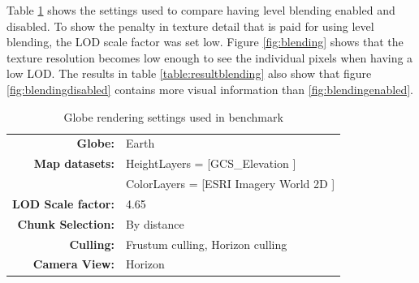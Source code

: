 Table \ref{table:levelblending} shows the settings used to compare having level blending enabled and disabled. To show the penalty in texture detail that is paid for using level blending, the LOD scale factor was set low. Figure \ref{fig:blending} shows that the texture resolution becomes low enough to see the individual pixels when having a low LOD. The results in table \ref{table:resultblending} also show that figure \ref{fig:blendingdisabled} contains more visual information than \ref{fig:blendingenabled}. 

\begin{table}
  \centering
  \caption[]{Globe rendering settings used in benchmark}
    \label{table:levelblending}
  \begin{tabular}{| r l |}
    \hline
      \textbf{Globe:}             & Earth \\
      \textbf{Map datasets:}      & HeightLayers = [GCS\_Elevation \cite{worldelevation3d}] \\
                                  & ColorLayers = [ESRI Imagery World 2D \cite{imageryworld2d}] \\
      \textbf{LOD Scale factor:}  & 4.65 \\
      \textbf{Chunk Selection:}    & By distance \\
      \textbf{Culling:}           & Frustum culling, Horizon culling \\
      \textbf{Camera View:}       & Horizon \\
    \hline
  \end{tabular}
\end{table}

